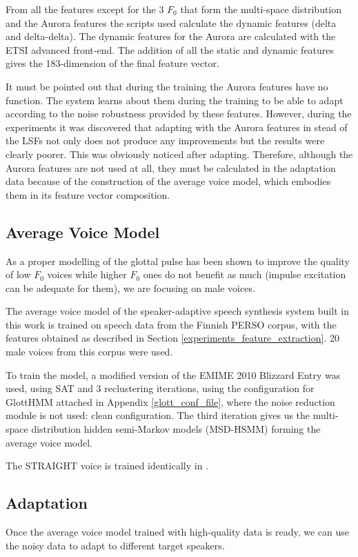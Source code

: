 From all the features except for the 3 $F_{0}$ that form the multi-space distribution and the Aurora features the scripts used calculate the dynamic features (delta and delta-delta). 
%
The dynamic features for the Aurora are calculated with the ETSI advanced front-end.
%
The addition of all the static and dynamic features gives the 183-dimension of the final feature vector.

It must be pointed out that during the training the Aurora features have no function.
%
The system learns about them during the training to be able to adapt according to the noise robustness provided by these features.
%
However, during the experiments it was discovered that adapting with the Aurora features in stead of the LSFs not only does not produce any improvements but the results were clearly poorer.
%
This was obviously noticed after adapting. 
%
Therefore, although the Aurora features are not used at all, they must be calculated in the adaptation data because of the construction of the average voice model, which embodies them in its feature vector composition.

\subsection{Average Voice Model}
\label{experiments_av_voice_model}
As a proper modelling of the glottal pulse has been shown to improve the quality of low $F_{0}$ voices while higher $F_{0}$ ones do not benefit as much (impulse excitation can be adequate for them), we are focusing on male voices.

The average voice model of the speaker-adaptive speech synthesis system built in this work is trained on speech data from the Finnish PERSO corpus, with the features obtained as described in Section \ref{experiments_feature_extraction}.
%
20 male voices from this corpus were used.

To train the model, a modified version of the EMIME 2010 Blizzard Entry \cite{emime_blizzard} was used, using SAT and 3 reclustering iterations, using the configuration for GlottHMM attached in Appendix \ref{glott_conf_file}, where the noise reduction module is not used: clean configuration. 
%
The third iteration gives us the multi-space distribution hidden semi-Markov models (MSD-HSMM) forming the average voice model.

The STRAIGHT voice is trained identically in \cite{karhila_jstsp_14}.

\subsection{Adaptation}
\label{experiments_adaptation}
Once the average voice model trained with high-quality data is ready, we can use the noisy data to adapt to different target speakers.

